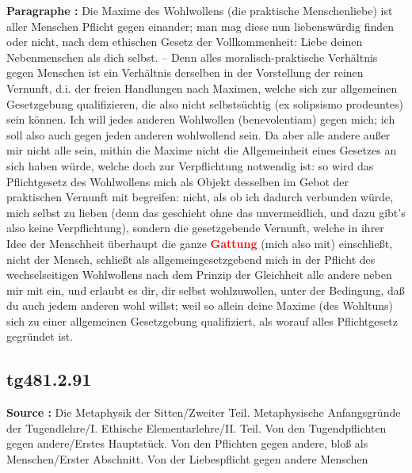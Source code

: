\documentclass[a4paper,12pt,twoside]{book}
\newcommand{\match}[1]{\textcolor{red}{\textbf{#1}}}
\begin{document}
	\textbf{Paragraphe : }Die Maxime des Wohlwollens (die praktische Menschenliebe) ist aller Menschen Pflicht gegen einander; man mag diese nun liebenswürdig finden oder nicht, nach dem ethischen Gesetz der Vollkommenheit: Liebe deinen Nebenmenschen als dich selbst. – Denn alles moralisch-praktische Verhältnis gegen Menschen ist ein Verhältnis derselben in der Vorstellung der reinen Vernunft, d.i. der freien Handlungen nach Maximen, welche sich zur allgemeinen Gesetzgebung qualifizieren, die also nicht selbstsüchtig (ex solipsismo prodeuntes) sein können. Ich will jedes anderen Wohlwollen (benevolentiam) gegen mich; ich soll also auch gegen jeden anderen wohlwollend sein. Da aber alle andere außer mir nicht alle sein, mithin die Maxime nicht die Allgemeinheit eines Gesetzes an sich haben würde, welche doch zur Verpflichtung notwendig ist: so wird das Pflichtgesetz des Wohlwollens mich als Objekt desselben im Gebot der praktischen Vernunft mit begreifen: nicht, als ob ich dadurch verbunden würde, mich selbst zu lieben (denn das geschieht ohne das unvermeidlich, und dazu gibt's also keine Verpflichtung), sondern die gesetzgebende Vernunft, welche in ihrer Idee der Menschheit überhaupt die ganze \match{Gattung} (mich also mit) einschließt, nicht der Mensch, schließt als allgemeingesetzgebend mich in der Pflicht des wechselseitigen Wohlwollens nach dem Prinzip der Gleichheit alle andere neben mir mit ein, und erlaubt es dir, dir selbst wohlzuwollen, unter der Bedingung, daß du auch jedem anderen wohl willst; weil so allein deine Maxime (des Wohltuns) sich zu einer allgemeinen Gesetzgebung qualifiziert, als worauf alles Pflichtgesetz gegründet ist. 
	
	\subsection*{tg481.2.91} 
	\textbf{Source : }Die Metaphysik der Sitten/Zweiter Teil. Metaphysische Anfangsgründe der Tugendlehre/I. Ethische Elementarlehre/II. Teil. Von den Tugendpflichten gegen andere/Erstes Hauptstück. Von den Pflichten gegen andere, bloß als Menschen/Erster Abschnitt. Von der Liebespflicht gegen andere Menschen\\  
	
\end{document}
